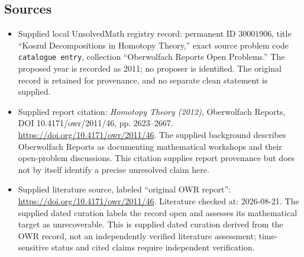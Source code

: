 \documentclass[11pt]{article}
\begin{document}
\subsection{Sources}
\begin{itemize}
\item Supplied local UnsolvedMath registry record: permanent ID \(30001906\), title ``Koszul Decompositions in Homotopy Theory,'' exact source problem code \texttt{catalogue entry}, collection ``Oberwolfach Reports Open Problems.'' The proposed year is recorded as 2011; no proposer is identified. The original record is retained for provenance, and no separate clean statement is supplied.
\item Supplied report citation: \emph{Homotopy Theory (2012)}, Oberwolfach Reports, DOI 10.4171/owr/2011/46, pp. 2623--2667. \url{https://doi.org/10.4171/owr/2011/46}. The supplied background describes Oberwolfach Reports as documenting mathematical workshops and their open-problem discussions. This citation supplies report provenance but does not by itself identify a precise unresolved claim here.
\item Supplied literature source, labeled ``original OWR report'': \url{https://doi.org/10.4171/owr/2011/46}. Literature checked at: 2026-08-21. The supplied dated curation labels the record open and assesses its mathematical target as unrecoverable. This is supplied dated curation derived from the OWR record, not an independently verified literature assessment; time-sensitive status and cited claims require independent verification.
\end{itemize}
\end{document}
